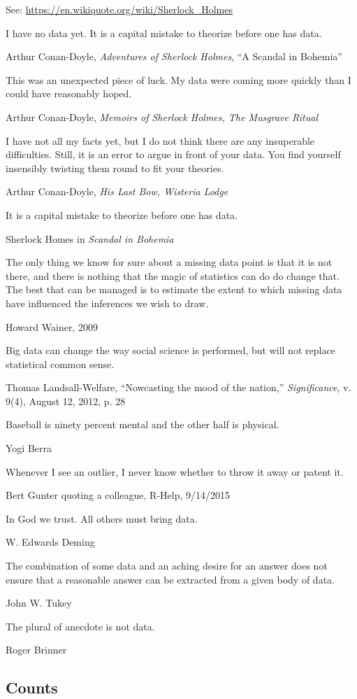 See: \url{https://en.wikiquote.org/wiki/Sherlock_Holmes}

\epigraph{I have no data yet. It is a capital mistake to theorize before one has data.}{Arthur Conan-Doyle, \emph{Adventures of Sherlock Holmes}, ``A Scandal in Bohemia''}

\epigraph{This was an unexpected piece of luck. My data were coming more quickly than I could have reasonably hoped.}{Arthur Conan-Doyle, \emph{Memoirs of Sherlock Holmes, The Musgrave Ritual}}


\epigraph{I have not all my facts yet, but I do not think there are any insuperable difficulties. Still, it is an error to argue in front of your data. You find yourself insensibly twisting them round to fit your theories.}{Arthur Conan-Doyle, \emph{His Last Bow, Wisteria Lodge}}

\epigraph{It is a capital mistake to theorize before one has data.}{Sherlock Homes in \emph{Scandal in Bohemia}}


\epigraph{The only thing we know for sure about a missing data point is that it is not there, and there is nothing that the magic of statistics can do do change that.  The best that can be managed is to estimate the extent to which missing data have influenced the inferences we wish to draw.}{Howard Wainer, 2009}

\epigraph{Big data can change the way social science is performed, but will not replace statistical common sense.}{Thomas Landsall-Welfare, ``Nowcasting the mood of the nation,'' \emph{Significance}, v. 9(4), August 12, 2012, p. 28} 

\epigraph{Baseball is ninety percent mental and the other half is physical.}{Yogi Berra}

\epigraph{Whenever I see an outlier, I never know whether to throw it away or patent it.}{Bert Gunter quoting a colleague, R-Help, 9/14/2015}

\epigraph{In God we trust. All others must bring data.}{W. Edwards Deming}

\epigraph{The combination of some data and an aching desire for an answer does not ensure that a reasonable answer can be extracted from a given body of data.}{John W. Tukey}

\epigraph{The plural of anecdote is not data.}{Roger Brinner}
\subsection{Counts}

